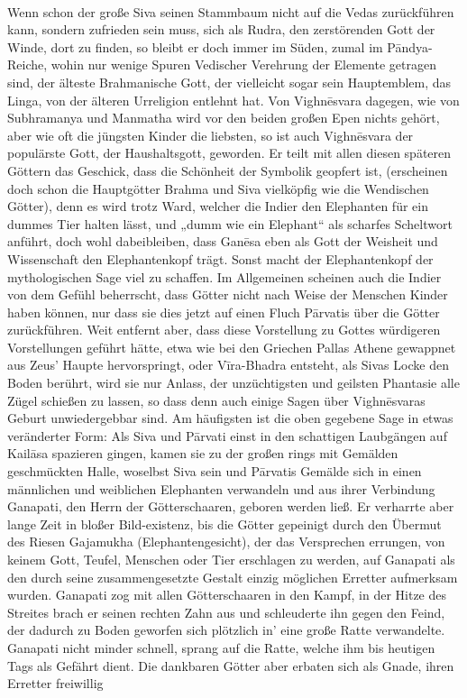 \documentclass{article}
\begin{document}
\begin{center}
\end{center}
\paragraph{}
Wenn schon der große Siva seinen Stammbaum nicht auf die Vedas zurückführen kann, sondern zufrieden sein muss, sich als Rudra, den zerstörenden Gott der Winde, dort zu finden, so bleibt er doch immer im Süden, zumal im P\={a}ndya-Reiche, wohin nur wenige Spuren Vedischer Verehrung der Elemente getragen sind, der älteste Brahmanische Gott, der vielleicht sogar sein Hauptemblem, das Linga, von der älteren Urreligion entlehnt hat. Von Vighn\={e}svara dagegen, wie von Subhramanya und Manmatha wird vor den beiden großen Epen nichts gehört, aber wie oft die jüngsten Kinder die liebsten, so ist auch Vighn\={e}svara der populärste Gott, der Haushaltsgott, geworden. Er teilt mit allen diesen späteren Göttern das Geschick, dass die Schönheit der Symbolik geopfert ist, (erscheinen doch schon die Hauptgötter Brahma und Siva vielköpfig wie die Wendischen Götter), denn es wird trotz Ward, welcher die Indier den Elephanten für ein dummes Tier halten lässt, und „dumm wie ein Elephant“ als scharfes Scheltwort anführt, doch wohl dabeibleiben, dass Gan\={e}sa eben als Gott der Weisheit und Wissenschaft den Elephantenkopf trägt. Sonst macht der Elephantenkopf der mythologischen Sage viel zu schaffen. Im Allgemeinen scheinen auch die Indier von dem Gefühl beherrscht, dass Götter nicht nach Weise der Menschen Kinder haben können, nur dass sie dies jetzt auf einen Fluch P\={a}rvatis über die Götter zurückführen. Weit entfernt aber, dass diese Vorstellung zu Gottes würdigeren Vorstellungen geführt hätte, etwa wie bei den Griechen Pallas Athene gewappnet aus Zeus' Haupte hervorspringt, oder V\={i}ra-Bhadra entsteht, als Sivas Locke den Boden berührt, wird sie nur Anlass, der unzüchtigsten und geilsten Phantasie alle Zügel schießen zu lassen, so dass denn auch einige Sagen über Vighn\={e}svaras Geburt unwiedergebbar sind. Am häufigsten ist die oben gegebene Sage in etwas veränderter Form: Als Siva und P\={a}rvati einst in den schattigen Laubgängen auf Kail\={a}sa spazieren gingen, kamen sie zu der großen rings mit Gemälden geschmückten Halle, woselbst Siva sein und P\={a}rvatis Gemälde sich in einen männlichen und weiblichen Elephanten verwandeln und aus ihrer Verbindung Ganapati, den Herrn der Götterschaaren, geboren werden ließ. Er verharrte aber lange Zeit in bloßer Bild-existenz, bis die Götter gepeinigt durch den Übermut des Riesen Gajamukha (Elephantengesicht), der das Versprechen errungen, von keinem Gott, Teufel, Menschen oder Tier erschlagen zu werden, auf Ganapati als den durch seine zusammengesetzte Gestalt einzig möglichen Erretter aufmerksam wurden. Ganapati zog mit allen Götterschaaren in den Kampf, in der Hitze des Streites brach er seinen rechten Zahn aus und schleuderte ihn gegen den Feind, der dadurch zu Boden geworfen sich plötzlich in' eine große Ratte verwandelte. Ganapati nicht minder schnell, sprang auf die Ratte, welche ihm bis heutigen Tags als Gefährt dient. Die dankbaren Götter aber erbaten sich als Gnade, ihren Erretter freiwillig 
\end{document}
